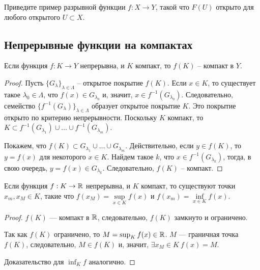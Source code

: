 \begin{problem}
    Приведите пример разрывной функции $f: X \to Y$, такой что $F(U)$ открыто для любого открытого $U \subset X$.
\end{problem}

\subsection{Непрерывные функции на компактах}

\begin{theorem}
    Если функция $f: K \to Y$ непрерывна, и $K$ компакт, то $f(K)$ -- компакт в $Y$.
\end{theorem}

\begin{proof}
    Пусть $\{G_{\lambda}\}_{\lambda \in \Lambda}$ -- открытое покрытие $f(K)$. Если $x \in K$, то существует такое $\lambda_{0} \in \Lambda$, что $f(x) \in G_{\lambda_{0}}$ и, значит, $x \in f^{-1}(G_{\lambda_{0}})$. Следовательно, семейство $\{f^{-1}(G_{\lambda})\}_{\lambda \in \Lambda}$ образует открытое покрытие $K$. Это покрытие открыто по критерию непрерывности. Поскольку $K$ компакт, то $K \subset f^{-1}(G_{\lambda_{1}}) \cup \ldots \cup f^{-1}(G_{\lambda_{m}})$.

    Покажем, что $f(K) \subset G_{\lambda_{1}} \cup \ldots \cup G_{\lambda_{m}}$. Действительно, если $y \in f(K)$, то $y = f(x)$ для некоторого $x \in K$. Найдем такое $k$, что $x \in f^{-1}(G_{\lambda_{k}})$, тогда, в свою очередь, $y = f(x) \in G_{\lambda_{k}}$. Следовательно, $f(K)$ -- компакт.
\end{proof}

\begin{corollary}
    \label{weierstrass-compacts}
    Если функция $f: K \to \mathbb{R}$ непрерывна, и $K$ компакт, то существуют точки $x_{m}, x_{M} \in K$, такие что $f(x_{M}) = \underset{x \in K}{\sup}f(x)$ и $f(x_{m}) = \underset{x \in K}{\inf} f(x)$.
\end{corollary}

\begin{proof}
    $f(K)$ --- компакт в $\mathbb{R}$, следовательно, $f(K)$ замкнуто и ограничено.

    Так как $f(K)$ ограничено, то $M = \sup_K f(x) \in \mathbb{R}$. $M$ --- граничная точка $f(K)$, следовательно, $M \in f(K)$ и, значит, $\exists x_M \in K \ f(x) = M$.

    Доказательство для $\inf_K f$ аналогично.
\end{proof}

